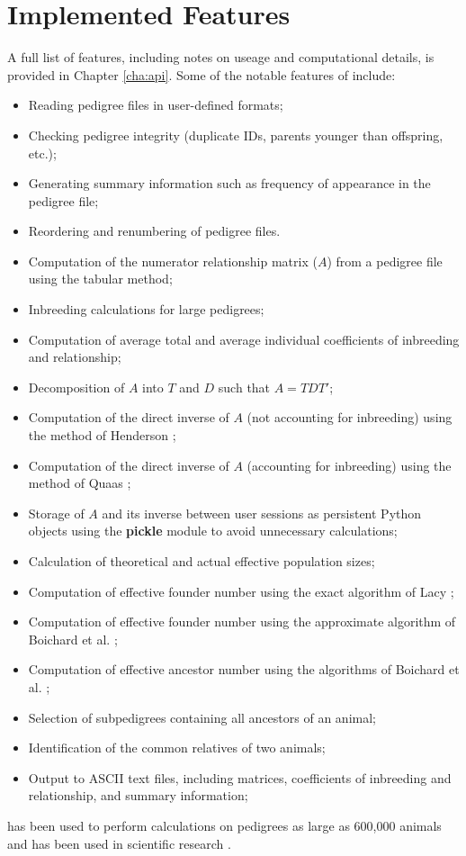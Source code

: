 \section{Implemented Features}
A full list of features, including notes on useage and computational details, is provided in Chapter \ref{cha:api}.  Some of the notable features of \PyPedal{} include:
\begin{itemize}
\item Reading pedigree files in user-defined formats;
\item Checking pedigree integrity (duplicate IDs, parents younger than offspring, etc.);
\item Generating summary information such as frequency of appearance in the pedigree file;
\item Reordering and renumbering of pedigree files.
\item Computation of the numerator relationship matrix ($A$) from a pedigree file using the tabular method;
\item Inbreeding calculations for large pedigrees;
\item Computation of average total and average individual coefficients of inbreeding and relationship;
\item Decomposition of $A$ into $T$ and $D$ such that $A=TDT'$;
\item Computation of the direct inverse of $A$ (not accounting for inbreeding) using the method of Henderson \citeyear{ref143};
\item Computation of the direct inverse of $A$ (accounting for inbreeding) using the method of Quaas \citeyear{ref235};
\item Storage of $A$ and its inverse between user sessions as persistent Python objects using the \textbf{pickle} module to avoid unnecessary calculations;
\item Calculation of theoretical and actual effective population sizes;
\item Computation of effective founder number using the exact algorithm of Lacy \citeyear{ref640};
\item Computation of effective founder number using the approximate algorithm of Boichard et al. \citeyear{ref352};
\item Computation of effective ancestor number using the algorithms of Boichard et al. \citeyear{ref352};
\item Selection of subpedigrees containing all ancestors of an animal;
\item Identification of the common relatives of two animals;
\item Output to ASCII text files, including matrices, coefficients of inbreeding and relationship, and summary information;
\end{itemize}
\PyPedal{} has been used to perform calculations on pedigrees as large as 600,000 animals and has been used in scientific research \cite{Cole2004a}.

